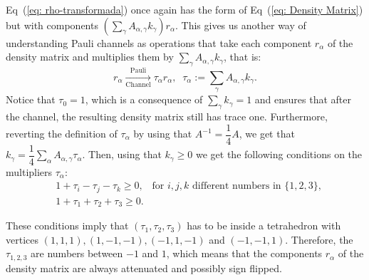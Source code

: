 \documentclass[10pt,letterpaper]{article} %
\newcommand{\eref}[1]{Eq~(\ref{#1})}
\begin{document}
\eref{eq: rho-transformada} once again has the form of \eref{eq: Density Matrix}
but with components $\left( \sum_{\gamma} A_{\alpha,\gamma} k_{\gamma} \right) r_{\alpha}$.
This gives us another way of understanding Pauli channels
as operations that take each component $r_{\alpha}$
of the density matrix and multiplies them
by $\sum_{\gamma} A_{\alpha,\gamma} k_{\gamma}$, 
that is:
\begin{equation}
\label{eq: multipliers}
r_{\alpha}  \xrightarrow[\text{Channel}]{\text{Pauli}}  \tau_{\alpha} r_{\alpha} ,\;\; \tau_{\alpha} := \sum_{\gamma} A_{\alpha,\gamma} k_{\gamma}.
\end{equation}
Notice that $\tau_0 = 1$, which is a consequence of $\sum_{\gamma}k_{\gamma}=1$
and ensures that after the channel, the resulting density matrix still has trace one. 
Furthermore, reverting the definition of $\tau_{\alpha}$ by using that $A^{-1} = \dfrac{1}{4} A$, 
we get that $k_{\gamma} = \dfrac{1}{4} \sum_{\alpha} A_{\alpha,\gamma} \tau_{\alpha}$.
Then, using that $k_{\gamma} \geq 0$
we get the following conditions on the multipliers $\tau_{\alpha}$:
\begin{eqnarray}
\label{eq: conditions-tetrahedron}
&1+\tau_i -\tau_j - \tau_k \geq 0,  \;\;\; \text{for $i,j,k$ different numbers in $\{1,2,3\}$}, \\
&1+\tau_1 + \tau_2 + \tau_3 \geq 0.
\end{eqnarray}

These conditions imply that $(\tau_1,\tau_2,\tau_3)$
has to be inside a tetrahedron with
vertices $(1,1,1), (1,-1,-1), (-1,1,-1)$ and $(-1,-1,1)$. 
Therefore, the $\tau_{1,2,3}$ are numbers between 
$-1$ and $1$, which means that the components
$r_{\alpha}$ of the density matrix are always 
attenuated and possibly sign flipped.
\end{document}
